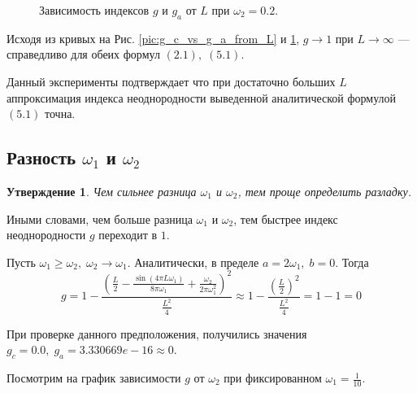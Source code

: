 \documentclass[specialist, substylefile = spbu.rtx,
			   subf, href, 12pt]{disser}
\begin{document}
\begin{figure}[!hhh]
	\caption{Зависимость индексов $ g $ и $ g_a $ от $ L $ при $ \omega_2 = 0.2 $.}
	\label{pic:g_c_vs_g_a_from_L_1}
\end{figure}



Исходя из кривых на Рис. \ref{pic:g_c_vs_g_a_from_L} и \ref{pic:g_c_vs_g_a_from_L_1}, $ g \rightarrow 1 \text{ при } L \rightarrow \infty$ --- справедливо для обеих формул $ (2.1), \; (5.1) $. 

Данный эксперименты подтверждает что при достаточно больших $ L $ аппроксимация индекса неоднородности выведенной аналитической формулой $ (5.1) $ точна.

\subsection{Разность $\omega_1$ и $ \omega_2 $}
\newtheorem{statement}{Утверждение}

\begin{statement}
	Чем сильнее разница $ \omega_1 $ и $ \omega_2 $, тем проще определить разладку.
\end{statement}

Иными словами, чем больше разница $ \omega_1 $ и $ \omega_2 $, тем быстрее индекс неоднородности $ g $ переходит в $ 1 $.

Пусть $ \omega_1 \geq \omega_2, \; \omega_2 \rightarrow \omega_1 $. Аналитически, в пределе $ a = 2\omega_1,\; b = 0 $. Тогда $$ g = 1 - \frac{(\frac{L}{2} - \frac{\sin(4\pi L\omega_1)}{8\pi\omega_1} + \frac{\omega_2}{2\pi\omega_1^2})^2}{\frac{L^2}{4}} \approx 1 - \frac{(\frac{L}{2})^2}{\frac{L^2}{4}} = 1 - 1 = 0 $$

При проверке данного предположения, получились значения $ g_c = 0.0,\; g_a = 3.330669e-16 \approx 0 $.

Посмотрим на график зависимости $ g $ от $ \omega_2 $ при фиксированном $ \omega_1 = \frac{1}{10} $.
\end{document}
